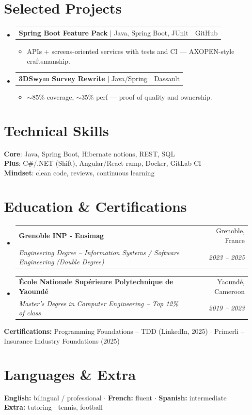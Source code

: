 \documentclass[letterpaper,10.5pt]{article}
\makeatletter
\newcommand{\resumeItem}[1]{\item\small{#1 \vspace{-1.5pt}}}
\newcommand{\resumeSubheading}[4]{\vspace{-1pt}\item\begin{tabular*}{0.97\textwidth}[t]{l@{\extracolsep{\fill}}r}\textbf{#1} & #2 \\\textit{\small#3} & \textit{\small #4} \\\end{tabular*}\vspace{-5pt}}
\newcommand{\resumeProjectHeading}[2]{\item\begin{tabular*}{0.97\textwidth}{l@{\extracolsep{\fill}}r}\small#1 & #2 \\\end{tabular*}\vspace{-5pt}}
\newcommand{\resumeSubHeadingListStart}{\begin{itemize}[leftmargin=0.15in, label={}]}
\newcommand{\resumeSubHeadingListEnd}{\end{itemize}}
\newcommand{\resumeItemListStart}{\begin{itemize}[leftmargin=0.18in]}
\newcommand{\resumeItemListEnd}{\end{itemize}\vspace{-3pt}}
\makeatother
\begin{document}
\section{Selected Projects}
\resumeSubHeadingListStart
  \resumeProjectHeading{\textbf{Spring Boot Feature Pack} $|$ Java, Spring Boot, JUnit}{GitHub}
    \resumeItemListStart
      \resumeItem{APIs + screens-oriented services with tests and CI --- AXOPEN-style craftsmanship.}
    \resumeItemListEnd
  \resumeProjectHeading{\textbf{3DSwym Survey Rewrite} $|$ Java/Spring}{Dassault}
    \resumeItemListStart
      \resumeItem{$\sim$85\% coverage, $\sim$35\% perf --- proof of quality and ownership.}
    \resumeItemListEnd
\resumeSubHeadingListEnd

\section{Technical Skills}
\begin{itemize}[leftmargin=0.15in, label={}]\small{\item{\textbf{Core}: Java, Spring Boot, Hibernate notions, REST, SQL \\ \textbf{Plus}: C\#/.NET (Shift), Angular/React ramp, Docker, GitLab CI \\ \textbf{Mindset}: clean code, reviews, continuous learning}}\end{itemize}
\section{Education \& Certifications}
\resumeSubHeadingListStart
  \resumeSubheading
    {Grenoble INP - Ensimag}{Grenoble, France}
    {Engineering Degree -- Information Systems / Software Engineering (Double Degree)}{2023 -- 2025}
  \resumeSubheading
    {\'Ecole Nationale Sup\'erieure Polytechnique de Yaound\'e}{Yaound\'e, Cameroon}
    {Master's Degree in Computer Engineering -- Top 12\% of class}{2019 -- 2023}
\resumeSubHeadingListEnd
\small{\textbf{Certifications:} Programming Foundations -- TDD (LinkedIn, 2025) $\cdot$ Primerli -- Insurance Industry Foundations (2025)}
\section{Languages \& Extra}
\small{\textbf{English:} bilingual / professional $\cdot$ \textbf{French:} fluent $\cdot$ \textbf{Spanish:} intermediate \\
\textbf{Extra:} tutoring $\cdot$ tennis, football}
\end{document}
